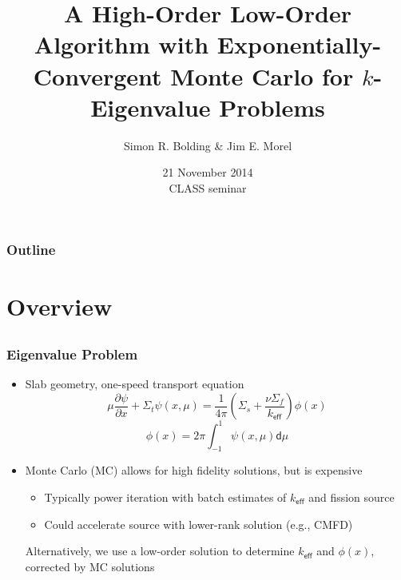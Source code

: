 \documentclass[xcolor=dvipsnames]{beamer}
\title{A High-Order Low-Order Algorithm with Exponentially-Convergent Monte Carlo for
    $k$-Eigenvalue Problems}
\author{{\large Simon R. Bolding \& Jim E. Morel}}
\date{21 November 2014 \\ \vspace{0.05in} {CLASS seminar}}
\newcommand{\keff}[0]{\ensuremath{{k}_{\textsf{eff}}} }
\newlength{\wideitemsep}
\let\olditem\item
\renewcommand{\item}{\setlength{\itemsep}{\wideitemsep}\olditem}
\newcommand{\pderiv}[2]{\frac{\partial #1}{\partial #2}}
\renewcommand{\d}{\mathsf{d}}
\begin{document}
\begin{frame}
    \titlepage \vspace{-0.213in}
    \begin{center}
    \end{center}    
\end{frame}

\setlength{\tabcolsep}{6pt}

\begin{frame}
\frametitle{Outline}
\begin{minipage}{0.061\linewidth}
\hfill                      
\end{minipage}
\begin{minipage}{0.8\linewidth}
\tableofcontents[
hideothersubsections,
sectionstyle=show,
subsectionstyle=hide
]
\end{minipage}

\end{frame}


\section{Overview}
\subsection{}

\begin{frame}
    \frametitle{Eigenvalue Problem}
    \begin{itemize}
        \item Slab geometry, one-speed transport equation
    \begin{equation*}
    \mu \pderiv{\psi}{x} + \Sigma_t \psi(x,\mu)
    = \frac{1}{4\pi}\left(\Sigma_s  + \frac{\nu \Sigma_f}{\keff} 
    \right) \phi(x)
    \end{equation*}
    \vspace{-0.2in}
\begin{equation*}
    \phi(x) = 2 \pi \int_{-1}^1 \psi(x,\mu) \d\mu
\end{equation*}
\pause
    \item Monte Carlo (MC) allows for high fidelity solutions, but is expensive
        \begin{itemize}
            \item Typically power iteration with batch estimates of
        $\keff$ and fission source
            \item Could accelerate source with lower-rank solution (e.g., CMFD)
        \end{itemize}
        \pause
        \begin{block}{} Alternatively, we use a low-order solution to determine
        $\keff$ and $\phi(x)$, corrected by MC solutions\end{block}
\end{itemize}
\end{frame}
\end{document}
